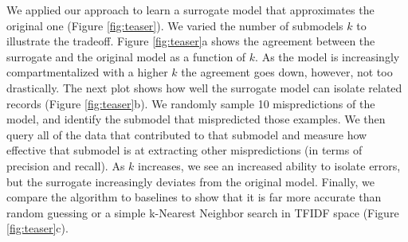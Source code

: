 We applied our approach to learn a surrogate model that approximates the original one (Figure \ref{fig:teaser}). We varied the number of submodels $k$ to illustrate the tradeoff. Figure \ref{fig:teaser}a shows the agreement between the surrogate and the original model as a function of $k$. As the model is increasingly compartmentalized with a higher $k$ the agreement goes down, however, not too drastically. The next plot shows how well the surrogate model can isolate related records (Figure \ref{fig:teaser}b). We randomly sample 10 mispredictions of the model, and identify the submodel that mispredicted those examples. We then query all of the data that contributed to that submodel and measure how effective that submodel is at extracting other mispredictions (in terms of precision and recall).
As $k$ increases, we see an increased ability to isolate errors, but the surrogate increasingly deviates from the original model.
Finally, we compare the algorithm to baselines to show that it is far more accurate than random guessing or a simple k-Nearest Neighbor search in TFIDF space (Figure \ref{fig:teaser}c).


